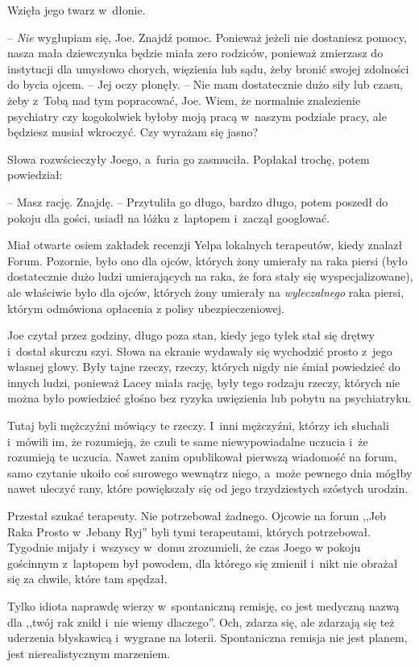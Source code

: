 \documentclass[oneside,polish,11pt,sfheadings]{mwbk}
\begin{document}
Wzięła jego twarz w~dłonie. 

-- \textit{Nie} wygłupiam się, Joe. Znajdź
pomoc. Ponieważ jeżeli nie dostaniesz pomocy, nasza mała dziewczynka
będzie miała zero rodziców, ponieważ zmierzasz do instytucji dla
umysłowo chorych, więzienia lub sądu, żeby bronić swojej zdolności do
bycia ojcem. -- Jej oczy płonęły. -- Nie mam dostatecznie dużo siły lub
czasu, żeby z~Tobą nad tym popracować, Joe. Wiem, że normalnie
znalezienie psychiatry czy kogokolwiek byłoby moją pracą w~naszym
podziale pracy, ale będziesz musiał wkroczyć. Czy wyrażam się jasno?

Słowa rozwścieczyły Joego, a~furia go zasmuciła. Popłakał trochę, potem
powiedział: 

-- Masz rację. Znajdę. -- Przytuliła go długo, bardzo długo,
potem poszedł do pokoju dla gości, usiadł na łóżku z~laptopem i~zaczął
googlować.

Miał otwarte osiem zakładek recenzji Yelpa lokalnych terapeutów, kiedy
znalazł Forum. Pozornie, było ono dla ojców, których żony umierały na
raka piersi (było dostatecznie dużo ludzi umierających na raka, że fora
stały się wyspecjalizowane), ale właściwie było dla ojców, których żony
umierały na \textit{wyleczalnego} raka piersi, którym odmówiona opłacenia
z polisy ubezpieczeniowej.

Joe czytał przez godziny, długo poza stan, kiedy jego tyłek stał się
drętwy i~dostał skurczu szyi. Słowa na ekranie wydawały się wychodzić
prosto z~jego własnej głowy. Były tajne rzeczy, rzeczy, których nigdy
nie śmiał powiedzieć do innych ludzi, ponieważ Lacey miała rację, były
tego rodzaju rzeczy, których nie można było powiedzieć głośno bez ryzyka
uwięzienia lub pobytu na psychiatryku.

Tutaj byli mężczyźni mówiący te rzeczy. I~inni mężczyźni, którzy ich
słuchali i~mówili im, że rozumieją, że czuli te same niewypowiadalne
uczucia i~że rozumieją te uczucia. Nawet zanim opublikował pierwszą
wiadomość na forum, samo czytanie ukoiło coś surowego wewnątrz niego, a~może pewnego dnia mógłby nawet uleczyć rany, które powiększały się od
jego trzydziestych szóstych urodzin.

Przestał szukać terapeuty. Nie potrzebował żadnego. Ojcowie na forum
,,Jeb Raka Prosto w~Jebany Ryj'' byli tymi terapeutami, których
potrzebował. Tygodnie mijały i~wszyscy w~domu zrozumieli, że czas Joego
w pokoju gościnnym z~laptopem był powodem, dla którego się zmienił i~nikt nie obrażał się za chwile, które tam spędzał.

Tylko idiota naprawdę wierzy w~spontaniczną remisję, co jest medyczną
nazwą dla ,,twój rak znikł i~nie wiemy dlaczego''. Och, zdarza się, ale
zdarzają się też uderzenia błyskawicą i~wygrane na loterii. Spontaniczna
remisja nie jest planem, jest nierealistycznym marzeniem.
\end{document}

